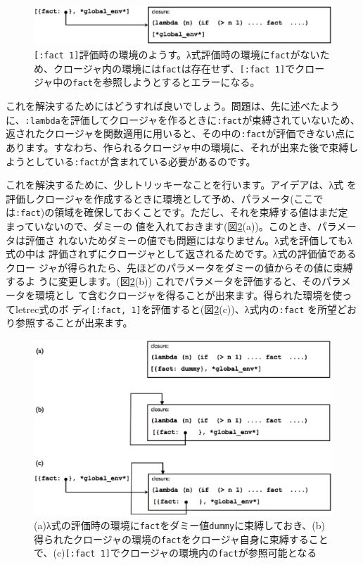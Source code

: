 \begin{figure}[htbp]
\begin{center}
\includegraphics[width=140mm]{images/let.eps}
\end{center}
\caption{{\tt [:fact 1]}評価時の環境のようす。λ式評価時の環境に{\tt fact}がないため、クロージャ内の環境には{\tt fact}は存在せず、{\tt [:fact 1]}でクロージャ中の{\tt fact}を参照しようとするとエラーになる。}
\label{fig:let}
\end{figure}

これを解決するためにはどうすれば良いでしょう。問題は、先に述べたように、{\tt :lambda}を評価してクロージャを作るときに{\tt :fact}が束縛されていないため、返されたクロージャを関数適用に用いると、その中の{\tt :fact}が評価できない点にあります。すなわち、作られるクロージャ中の環境に、それが出来た後で束縛しようとしている{\tt :fact}が含まれている必要があるのです。

これを解決するために、少しトリッキーなことを行います。アイデアは、λ式
を評価しクロージャを作成するときに環境として予め、パラメータ(ここで
は{\tt :fact})の領域を確保しておくことです。ただし、それを束縛する値はまだ定
まっていないので、ダミーの
値を入れておきます(図\ref{fig:letrec}(a))。このとき、パラメータは評価さ
れないためダミーの値でも問題にはなりません。λ式を評価してもλ式の中は
評価されずにクロージャとして返されるためです。λ式の評価値であるクロー
ジャが得られたら、先ほどのパラメータをダミーの値からその値に束縛するよ
うに変更します。(図\ref{fig:letrec}(b))
これでパラメータを評価すると、そのパラメータを環境とし
て含むクロージャを得ることが出来ます。得られた環境を使ってletrec式のボ
ディ{\tt [:fact, 1]}を評価すると(図\ref{fig:letrec}(c))、λ式内の{\tt :fact}
を所望どおり参照することが出来ます。

\begin{figure}[htbp]
\begin{center}
\includegraphics[width=140mm]{images/letrec.eps}
\end{center}
\caption{(a)λ式の評価時の環境に{\tt fact}をダミー値{\tt dummy}に束縛しておき、(b)得られたクロージャの環境の{\tt fact}をクロージャ自身に束縛することで、(c){\tt [:fact 1]}でクロージャの環境内の{\tt fact}が参照可能となる}
\label{fig:letrec}
\end{figure}


